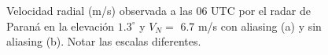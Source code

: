 \documentclass[12pt,spanish,oneside, a4paper]{book}
\begin{document}
\begin{figure}

{\centering {}

}

\caption{Velocidad radial (m/s) observada a las 06 UTC por el radar de Paraná en la elevación $1.3^{\circ}$ y $V_N =$ 6.7 m/s con aliasing (a) y sin aliasing (b). Notar las escalas diferentes.}\label{fig:aliasing}
\end{figure}
\end{document}
